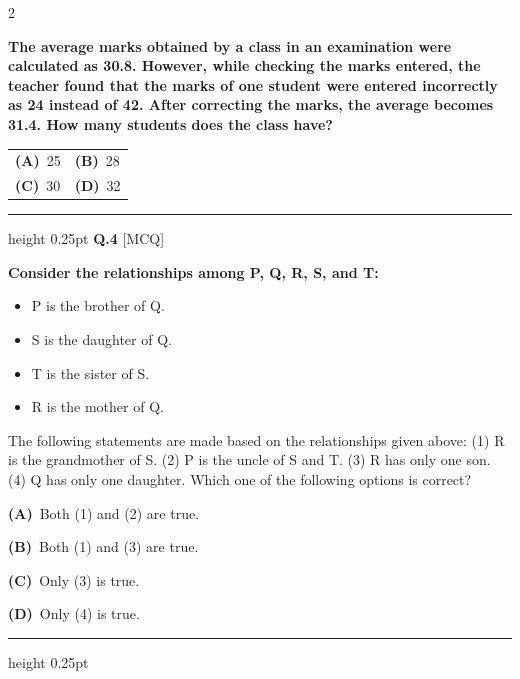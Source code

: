 \documentclass[a4paper,10pt,twoside]{article}
\begin{document}
\begin{multicols}{2}
\par\vspace{2pt}
{\bfseries The average marks obtained by a class in an examination were calculated as 30.8. However, while checking the marks entered, the teacher found that the marks of one student were entered incorrectly as 24 instead of 42. After correcting the marks, the average becomes 31.4. How many students does the class have? \par}
\par\vspace{2pt}\noindent
\begin{tabular*}{\columnwidth}{@{\extracolsep{\fill}}p{}p{}@{}}
\textbf{(A)}~25 & \textbf{(B)}~28 \\
\addlinespace[2pt]
\textbf{(C)}~30 & \textbf{(D)}~32
\end{tabular*}
\par\vspace{6pt}\hrule height 0.25pt\vspace{6pt}
\noindent\textbf{Q.4} \hfill {\footnotesize\textsf{[MCQ]}}
\par\vspace{2pt}
{\bfseries Consider the relationships among P, Q, R, S, and T:
\begin{itemize}
\item P is the brother of Q.
\item S is the daughter of Q.
\item T is the sister of S.
\item R is the mother of Q.
\end{itemize}
The following statements are made based on the relationships given above:
(1) R is the grandmother of S.
(2) P is the uncle of S and T.
(3) R has only one son.
(4) Q has only one daughter.
Which one of the following options is correct? \par}
\par\vspace{2pt}\noindent
\textbf{(A)}~Both (1) and (2) are true.\par\vspace{2pt}\noindent
\textbf{(B)}~Both (1) and (3) are true.\par\vspace{2pt}\noindent
\textbf{(C)}~Only (3) is true.\par\vspace{2pt}\noindent
\textbf{(D)}~Only (4) is true.
\par\vspace{6pt}\hrule height 0.25pt\vspace{6pt}


\end{multicols}
\end{document}
